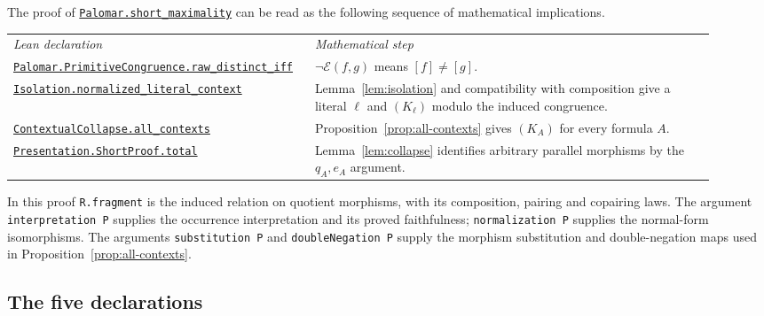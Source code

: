 \documentclass[11pt]{article}
\begin{document}
The proof of \href{https://github.com/flengyel/Dosen-Petric-Maximality/blob/dosen-petric-v25-palomar-v3/DosenPetric/PalomarMaximality.lean\#L27}{\texttt{Palomar.short\_maximality}} can be read as
the following sequence of mathematical implications.
\begin{center}
\small
\begin{tabular}{>{\raggedright\arraybackslash}p{0.37\linewidth}>{\raggedright\arraybackslash}p{0.55\linewidth}}
\textit{Lean declaration} & \textit{Mathematical step}\\[3pt]
\href{https://github.com/flengyel/Dosen-Petric-Maximality/blob/dosen-petric-v25-palomar-v3/DosenPetric/PalomarCorrespondence.lean\#L121}{\texttt{Palomar.PrimitiveCongruence.\allowbreak{}raw\_distinct\_iff}}
 & $\neg\mathcal E(f,g)$ means $[f]\ne[g]$.\\[5pt]
\href{https://github.com/flengyel/Dosen-Petric-Maximality/blob/dosen-petric-v25-palomar-v3/DosenPetric/Isolation.lean\#L219}{\texttt{Isolation.\allowbreak{}normalized\_literal\_context}}
 & Lemma~\ref{lem:isolation} and compatibility with composition give a literal $\ell$ and $(K_\ell)$
   modulo the induced congruence.\\[5pt]
\href{https://github.com/flengyel/Dosen-Petric-Maximality/blob/dosen-petric-v25-palomar-v3/DosenPetric/Substitution.lean\#L90}{\texttt{ContextualCollapse.\allowbreak{}all\_contexts}}
 & Proposition~\ref{prop:all-contexts} gives $(K_A)$ for every formula $A$.\\[5pt]
\href{https://github.com/flengyel/Dosen-Petric-Maximality/blob/dosen-petric-v25-palomar-v3/DosenPetric/PresentationShortProjection.lean\#L86}{\texttt{Presentation.ShortProof.\allowbreak{}total}}
 & Lemma~\ref{lem:collapse} identifies arbitrary parallel morphisms by
   the $q_A,e_A$ argument.
\end{tabular}
\end{center}
In this proof \texttt{R.fragment} is the induced relation on
quotient morphisms, with its composition, pairing and copairing
laws. The argument \texttt{interpretation P} supplies the
occurrence interpretation and its proved faithfulness;
\texttt{normalization P} supplies the normal-form isomorphisms.
The arguments \texttt{substitution P} and
\texttt{doubleNegation P} supply the morphism substitution and
double-negation maps used in Proposition~\ref{prop:all-contexts}.

\subsection{The five declarations}
\end{document}
